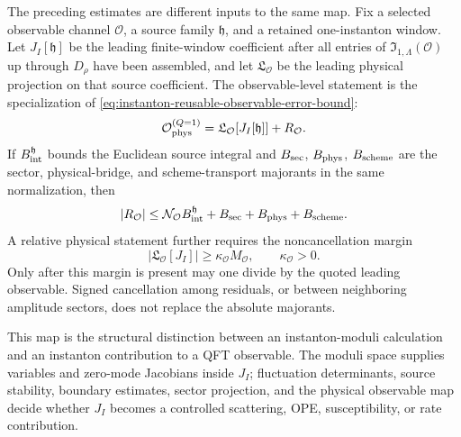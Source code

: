 \begin{controlledapproximation}
\label{ca:instanton-observable-assembly-ladder}
The preceding estimates are different inputs to the same map.  Fix a selected
observable channel \(\mathcal O\), a source family \(\mathfrak h\), and a
retained one-instanton window.  Let \(J_I[\mathfrak h]\) be the leading
finite-window coefficient after all entries of
\(\mathfrak I_{1,\Lambda}(\mathcal O)\) up through \(D_\rho\) have been
assembled, and let \(\mathfrak L_{\mathcal O}\) be the leading physical
projection on that source coefficient.  The observable-level statement is the
specialization of
\eqref{eq:instanton-reusable-observable-error-bound}:
\begin{equation}
  \mathcal O_{\rm phys}^{(Q=1)}
  =
  \mathfrak L_{\mathcal O}\!\left[J_I[\mathfrak h]\right]
  +R_{\mathcal O}.
  \label{eq:instanton-observable-assembly-ladder}
\end{equation}
If \(B_{\rm int}^{\mathfrak h}\) bounds the Euclidean source integral and
\(B_{\rm sec}\), \(B_{\rm phys}\), \(B_{\rm scheme}\) are the sector,
physical-bridge, and scheme-transport majorants in the same normalization, then
\begin{equation}
  |R_{\mathcal O}|
  \le
  \mathcal N_{\mathcal O}B_{\rm int}^{\mathfrak h}
  +B_{\rm sec}+B_{\rm phys}+B_{\rm scheme}.
  \label{eq:instanton-observable-assembly-bound}
\end{equation}
A relative physical statement further requires the noncancellation margin
\[
  |\mathfrak L_{\mathcal O}[J_I]|\ge\kappa_{\mathcal O} M_{\mathcal O},
  \qquad \kappa_{\mathcal O}>0.
\]
Only after this margin is present may one divide by the quoted leading
observable.  Signed cancellation among residuals, or between neighboring
amplitude sectors, does not replace the absolute majorants.

This map is the structural distinction between an instanton-moduli calculation
and an instanton contribution to a QFT observable.  The moduli space supplies
variables and zero-mode Jacobians inside \(J_I\); fluctuation determinants,
source stability, boundary estimates, sector projection, and the physical
observable map decide whether \(J_I\) becomes a controlled scattering, OPE,
susceptibility, or rate contribution.
\end{controlledapproximation}

